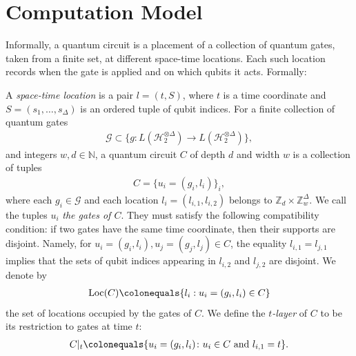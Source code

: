 
\section{Computation Model}

\newcommand{\comDAG}{\pi[C,\mathcal{E}]} 
Informally, a quantum circuit is a placement of a collection of quantum gates, taken from a finite set, at different space-time locations. Each such location records when the gate is applied and on which qubits it acts. Formally:

\begin{definition}
  \label{def:quantcirc}
  A \emph{space-time location} is a pair $l=(t,S)$, where $t$ is a time coordinate and $S=(s_{1},\ldots,s_{\Delta})$ is an ordered tuple of qubit indices. For a finite collection of quantum gates
  \begin{equation*}
    \begin{split}
      \mathcal{G} \subset \Big\{ g \colon L(\mathcal{H}_{2}^{\otimes \Delta}) \to L(\mathcal{H}_{2}^{\otimes \Delta}) \Big\},
    \end{split}
  \end{equation*}
  and integers $w,d\in\mathbb{N}$, a quantum circuit $C$ of depth $d$ and width $w$ is a collection of tuples
  \begin{equation*}
    \begin{split}
      C=\{u_i=(g_i,l_i)\}_i,
    \end{split}
  \end{equation*}
  where each $g_i\in\mathcal{G}$ and each location $l_i=(l_{i,1},l_{i,2})$ belongs to $\mathbb{Z}_{d}\times \mathbb{Z}_{w}^{\Delta}$. We call the tuples $u_i$ \textit{the gates of $C$}. They must satisfy the following compatibility condition: if two gates have the same time coordinate, then their supports are disjoint. Namely, for $u_i=(g_i,l_i),u_j=(g_j,l_j)\in C$, the equality $l_{i,1}=l_{j,1}$ implies that the sets of qubit indices appearing in $l_{i,2}$ and $l_{j,2}$ are disjoint. We denote by
  \begin{equation*}
    \begin{split}
      \operatorname{Loc}(C) \colonequals \{l_i : u_i=(g_i,l_i)\in C\}
    \end{split}
  \end{equation*}
  the set of locations occupied by the gates of $C$. We define the \textit{$t$-layer} of $C$ to be its restriction to gates at time $t$:
  \begin{equation*}
    \begin{split}
      C|_{t} \colonequals \{u_i=(g_i,l_i)\colon u_i\in C \text{ and } l_{i,1}=t\}.
    \end{split}
  \end{equation*}
\end{definition}

